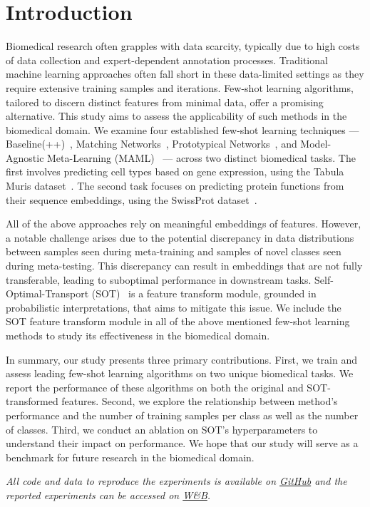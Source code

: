 \section{Introduction}

Biomedical research often grapples with data scarcity, typically due to high costs of data collection and expert-dependent annotation processes. 
Traditional machine learning approaches often fall short in these data-limited settings as they require extensive training samples and iterations. 
Few-shot learning algorithms, tailored to discern distinct features from minimal data, offer a promising alternative. 
This study aims to assess the applicability of such methods in the biomedical domain. We examine four established few-shot learning techniques — Baseline(++)~\cite{baseline}, 
Matching Networks~\cite{matchingnet}, Prototypical Networks~\cite{protonet}, and Model-Agnostic Meta-Learning (MAML)~\cite{maml} — across two distinct biomedical tasks. 
The first involves predicting cell types based on gene expression, using the Tabula Muris dataset~\cite{tabula2018}. The second task focuses on predicting protein functions 
from their sequence embeddings, using the SwissProt dataset~\cite{uniprot2019}.

All of the above approaches rely on meaningful embeddings of features. However, a notable challenge arises due to the potential discrepancy in data 
distributions between samples seen during meta-training and samples of novel classes seen during meta-testing. This discrepancy can result in embeddings that are 
not fully transferable, leading to suboptimal performance in downstream tasks. Self-Optimal-Transport (SOT)~\cite{sot} is a feature transform module, 
grounded in probabilistic interpretations, that aims to mitigate this issue. We include the SOT feature transform module in all of the above mentioned few-shot learning methods to 
study its effectiveness in the biomedical domain.

In summary, our study presents three primary contributions. First, we train and assess leading few-shot learning algorithms on two unique biomedical tasks. We 
report the performance of these algorithms on both the original and SOT-transformed features. Second, we explore the relationship between method's performance and
the number of training samples per class as well as the number of classes. Third, we conduct an ablation on SOT's hyperparameters to understand their impact on
performance. We hope that our study will serve as a benchmark for future research in the biomedical domain.


\textit{All code and data to reproduce the experiments is available on \href{https://github.com/mikasenghaas/few-shot-benchmark}{GitHub} and the reported experiments can be accessed on \href{https://wandb.ai/metameta-learners/few-shot-benchmark}{W\&B}.}
